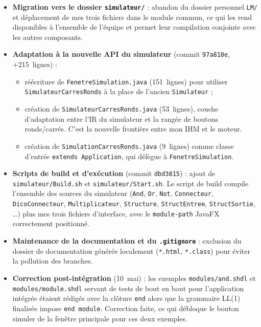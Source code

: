 \documentclass[11pt,a4paper]{article}
\begin{document}
\begin{itemize}
  \item \textbf{Migration vers le dossier \texttt{simulateur/}} : abandon du dossier personnel \texttt{LM/} et d\'eplacement de mes trois fichiers dans le module commun, ce qui les rend disponibles \`a l'ensemble de l'\'equipe et permet leur compilation conjointe avec les autres composants.
  \item \textbf{Adaptation \`a la nouvelle API du simulateur} (commit \texttt{97a810e}, +215~lignes) :
  \begin{itemize}
    \item r\'e\'ecriture de \texttt{FenetreSimulation.java} (151~lignes) pour utiliser \texttt{SimulateurCarresRonds} \`a la place de l'ancien \texttt{Simulateur} ;
    \item cr\'eation de \texttt{SimulateurCarresRonds.java} (53~lignes), couche d'adaptation entre l'IR du simulateur et la rang\'ee de boutons ronds/carr\'es. C'est la nouvelle fronti\`ere entre mon IHM et le moteur.
    \item cr\'eation de \texttt{SimulationCarresRonds.java} (9~lignes) comme classe d'entr\'ee \texttt{extends Application}, qui d\'el\`egue \`a \texttt{FenetreSimulation}.
  \end{itemize}
  \item \textbf{Scripts de build et d'ex\'ecution} (commit \texttt{dbd3815}) : ajout de \texttt{simulateur/Build.sh} et \texttt{simulateur/Start.sh}. Le script de build compile l'ensemble des sources du simulateur (\texttt{And}, \texttt{Or}, \texttt{Not}, \texttt{Connecteur}, \texttt{DicoConnecteur}, \texttt{Multipli\-cateur}, \texttt{Structure}, \texttt{StructEntree}, \texttt{StructSortie}, \dots) plus mes trois fichiers d'interface, avec le \texttt{module-path} JavaFX correctement positionn\'e.
  \item \textbf{Maintenance de la documentation et du \texttt{.gitignore}} : exclusion du dossier de documentation g\'en\'er\'ee localement (\texttt{*.html}, \texttt{*.class}) pour \'eviter la pollution des branches.
  \item \textbf{Correction post-int\'egration} (10~mai) : les exemples \texttt{modules/and.shdl} et \texttt{modules/module.shdl} servant de tests de bout en bout pour l'application int\'egr\'ee \'etaient r\'edig\'es avec la cl\^oture \texttt{end} alors que la grammaire LL(1) finalis\'ee impose \texttt{end~module}. Correction faite, ce qui d\'ebloque le bouton \og simuler \fg{} de la fen\^etre principale pour ces deux exemples.
\end{itemize}
\end{document}
